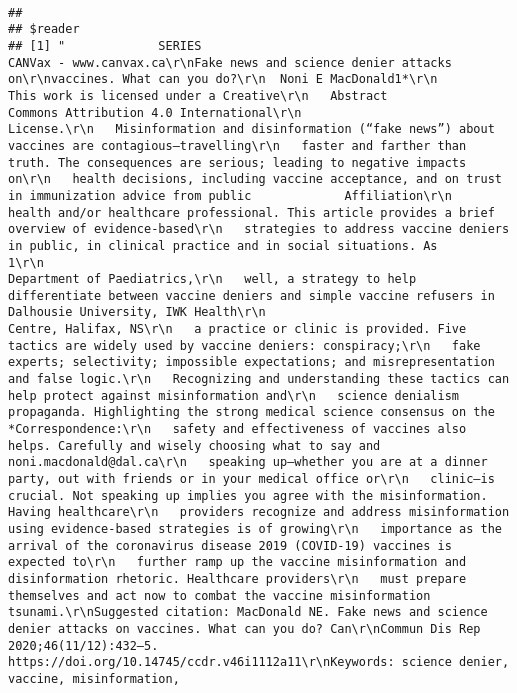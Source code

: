 \documentclass[
]{book}
\begin{document}
\begin{verbatim}
                                                                                                                                                                                                                                                                                             
## 
## $reader
## [1] "             SERIES                                                                                         CANVax - www.canvax.ca\r\nFake news and science denier attacks on\r\nvaccines. What can you do?\r\n  Noni E MacDonald1*\r\n                                                                                                               This work is licensed under a Creative\r\n   Abstract                                                                                                    Commons Attribution 4.0 International\r\n                                                                                                               License.\r\n   Misinformation and disinformation (“fake news”) about vaccines are contagious—travelling\r\n   faster and farther than truth. The consequences are serious; leading to negative impacts on\r\n   health decisions, including vaccine acceptance, and on trust in immunization advice from public             Affiliation\r\n   health and/or healthcare professional. This article provides a brief overview of evidence-based\r\n   strategies to address vaccine deniers in public, in clinical practice and in social situations. As          1\r\n                                                                                                                 Department of Paediatrics,\r\n   well, a strategy to help differentiate between vaccine deniers and simple vaccine refusers in               Dalhousie University, IWK Health\r\n                                                                                                               Centre, Halifax, NS\r\n   a practice or clinic is provided. Five tactics are widely used by vaccine deniers: conspiracy;\r\n   fake experts; selectivity; impossible expectations; and misrepresentation and false logic.\r\n   Recognizing and understanding these tactics can help protect against misinformation and\r\n   science denialism propaganda. Highlighting the strong medical science consensus on the                      *Correspondence:\r\n   safety and effectiveness of vaccines also helps. Carefully and wisely choosing what to say and              noni.macdonald@dal.ca\r\n   speaking up—whether you are at a dinner party, out with friends or in your medical office or\r\n   clinic—is crucial. Not speaking up implies you agree with the misinformation. Having healthcare\r\n   providers recognize and address misinformation using evidence-based strategies is of growing\r\n   importance as the arrival of the coronavirus disease 2019 (COVID-19) vaccines is expected to\r\n   further ramp up the vaccine misinformation and disinformation rhetoric. Healthcare providers\r\n   must prepare themselves and act now to combat the vaccine misinformation tsunami.\r\nSuggested citation: MacDonald NE. Fake news and science denier attacks on vaccines. What can you do? Can\r\nCommun Dis Rep 2020;46(11/12):432–5. https://doi.org/10.14745/ccdr.v46i1112a11\r\nKeywords: science denier, vaccine, misinformation, 
\end{verbatim}
\end{document}
